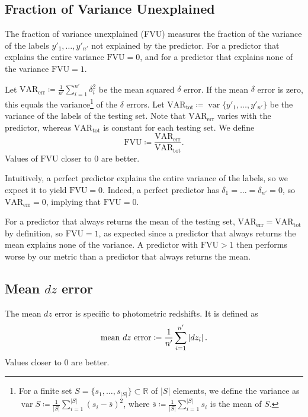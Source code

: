 \documentclass[11pt,twoside,openright]{report}
\newcommand\bbR{\mathbb{R}}
\newcommand\abs[1]{\left|#1\right|}
\DeclareMathOperator{\var}{var}
\begin{document}
\subsection{Fraction of Variance Unexplained}
The fraction of variance unexplained (FVU) measures the fraction of the variance of the labels $y'_1, \dots, y'_{n'}$ not explained by the predictor. For a predictor that explains the entire variance $\mathrm{FVU}=0$, and for a predictor that explains none of the variance $\mathrm{FVU}=1$.

Let $\mathrm{VAR_{err}} \coloneqq \frac{1}{n'}\sum_{i=1}^{n'}\delta_i^2$ be the mean squared $\delta$ error. If the mean $\delta$ error is zero, this equals the variance\footnote{For a finite set $S = \{s_1, \dots, s_{\abs{S}}\} \subset \bbR$ of $\abs{S}$ elements, we define the variance as $\var S \coloneqq \frac1{\abs{S}}\sum_{i=1}^{\abs{S}}(s_i - \overline{s})^2$, where $\overline{s} \coloneqq \frac1{\abs{S}}\sum_{i=1}^{\abs{S}}s_i$ is the mean of $S$.} of the $\delta$ errors. Let $\mathrm{VAR_{tot}} \coloneqq \var\{y'_1, \dots, y'_{n'}\}$ be the variance of the labels of the testing set. Note that $\mathrm{VAR_{err}}$ varies with the predictor, whereas $\mathrm{VAR_{tot}}$ is constant for each testing set. We define \[
  \mathrm{FVU} \coloneqq \frac{\mathrm{VAR_{err}}}{\mathrm{VAR_{tot}}} \text{.}
\]  Values of $\mathrm{FVU}$ closer to $0$ are better.

Intuitively, a perfect predictor explains the entire variance of the labels, so we expect it to yield $\mathrm{FVU} = 0$. Indeed, a perfect predictor has $\delta_1 = \dots = \delta_{n'} = 0$, so $\mathrm{VAR_{err}} = 0$, implying that $\mathrm{FVU} = 0$.

For a predictor that always returns the mean of the testing set, $\mathrm{VAR_{err}} = \mathrm{VAR_{tot}}$ by definition, so $\mathrm{FVU} = 1$, as expected since a predictor that always returns the mean explains none of the variance. A predictor with $\mathrm{FVU} > 1$ then performs worse by our metric than a predictor that always returns the mean.

\subsection{Mean $dz$ error}

The mean $dz$ error is specific to photometric redshifts. It is defined as \[
  \textrm{mean $dz$ error} \coloneqq \frac{1}{n'}\sum_{i=1}^{n'} \abs{dz_i} \text.
\] Values closer to $0$ are better.
\end{document}
